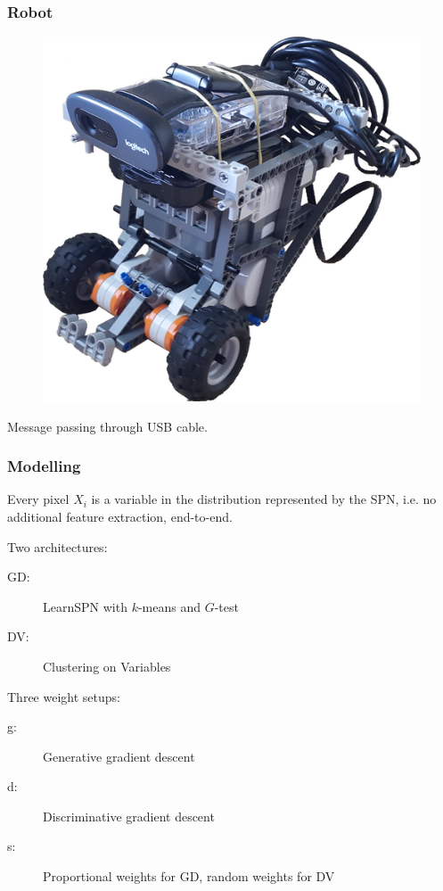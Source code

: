 \documentclass{beamer}
\begin{document}
\begin{frame}
  \frametitle{Robot}

  \begin{figure}
    \centering\includegraphics[height=0.5\textheight]{imgs/robot.png}
  \end{figure}

  \centering Message passing through USB cable.
\end{frame}

\begin{frame}
  \frametitle{Modelling}

  Every pixel $X_i$ is a variable in the distribution represented by the SPN, i.e. no additional
  feature extraction, end-to-end.

  Two architectures:
  \begin{description}
    \item[GD:] LearnSPN with $k$-means and $G$-test
    \item[DV:] Clustering on Variables
  \end{description}
  Three weight setups:
  \begin{description}
    \item[g:] Generative gradient descent
    \item[d:] Discriminative gradient descent
    \item[s:] Proportional weights for GD, random weights for DV
  \end{description}
\end{frame}
\end{document}
